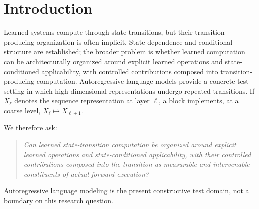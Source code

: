 \documentclass{article}
\begin{document}
\section{Introduction}
\label{sec:introduction}

Learned systems compute through state transitions, but their transition-producing
organization is often implicit. State dependence and conditional structure are
established; the broader problem is whether learned computation can be
architecturally organized around explicit learned operations and state-conditioned
applicability, with controlled contributions composed into transition-producing
computation. Autoregressive language models provide a concrete test setting in which
high-dimensional representations undergo repeated transitions. If
\(X_\ell\) denotes the sequence
representation at layer \(\ell\), a block implements, at a coarse level,
\(X_\ell\mapsto X_{\ell+1}\).

We therefore ask:
\begin{quote}
\emph{Can learned state-transition computation be organized around explicit
learned operations and state-conditioned applicability, with their controlled
contributions composed into the transition as measurable and intervenable
constituents of actual forward execution?}
\end{quote}

Autoregressive language modeling is the present constructive test domain, not a
boundary on this research question.
\end{document}

